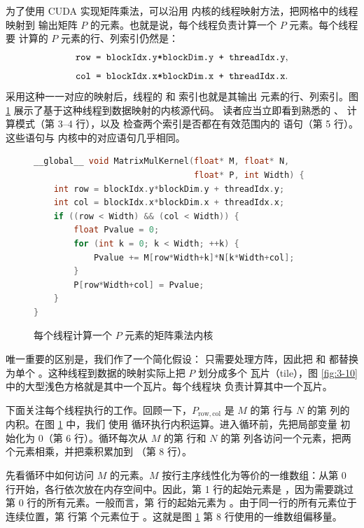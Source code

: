 为了使用 CUDA 实现矩阵乘法，可以沿用
 内核的线程映射方法，把网格中的线程映射到
输出矩阵 $P$ 的元素。也就是说，每个线程负责计算一个 $P$ 元素。每个线程要
计算的 $P$ 元素的行、列索引仍然是：
\[
  \code{row = blockIdx.y*blockDim.y + threadIdx.y},
\]
\[
  \code{col = blockIdx.x*blockDim.x + threadIdx.x}.
\]
采用这种一一对应的映射后，线程的  和  索引也就是其输出
元素的行、列索引。图 \ref{fig:3-11} 展示了基于这种线程到数据映射的内核源代码。
读者应当立即看到熟悉的 、 计算模式（第 3–4 行），以及
检查两个索引是否都在有效范围内的  语句（第 5 行）。这些语句与
 内核中的对应语句几乎相同。

\begin{figure}[htbp]
  \centering
  \begin{lstlisting}[language=C++]
__global__ void MatrixMulKernel(float* M, float* N,
                                float* P, int Width) {
    int row = blockIdx.y*blockDim.y + threadIdx.y;
    int col = blockIdx.x*blockDim.x + threadIdx.x;
    if ((row < Width) && (col < Width)) {
        float Pvalue = 0;
        for (int k = 0; k < Width; ++k) {
            Pvalue += M[row*Width+k]*N[k*Width+col];
        }
        P[row*Width+col] = Pvalue;
    }
}
  \end{lstlisting}
  \caption{每个线程计算一个 $P$ 元素的矩阵乘法内核}
  \label{fig:3-11}
\end{figure}

唯一重要的区别是，我们作了一个简化假设：
 只需要处理方阵，因此把  和 
都替换为单个 。这种线程到数据的映射实际上把 $P$ 划分成多个
瓦片（tile），图 \ref{fig:3-10} 中的大型浅色方格就是其中一个瓦片。每个线程块
负责计算其中一个瓦片。

下面关注每个线程执行的工作。回顾一下，$P_{\mathrm{row,col}}$ 是 $M$ 的第
 行与 $N$ 的第  列的内积。在图 \ref{fig:3-11} 中，我们
使用  循环执行内积运算。进入循环前，先把局部变量 
初始化为 0（第 6 行）。循环每次从 $M$ 的第  行和 $N$ 的第
 列各访问一个元素，把两个元素相乘，并把乘积累加到 
（第 8 行）。

先看循环中如何访问 $M$ 的元素。$M$ 按行主序线性化为等价的一维数组：从第 0
行开始，各行依次放在内存空间中。因此，第 1 行的起始元素是
，因为需要跳过第 0 行的所有元素。一般而言，第
 行的起始元素为 。由于同一行的所有元素位于
连续位置，第  行第  个元素位于
。这就是图 \ref{fig:3-11} 第 8 行使用的一维数组偏移量。

